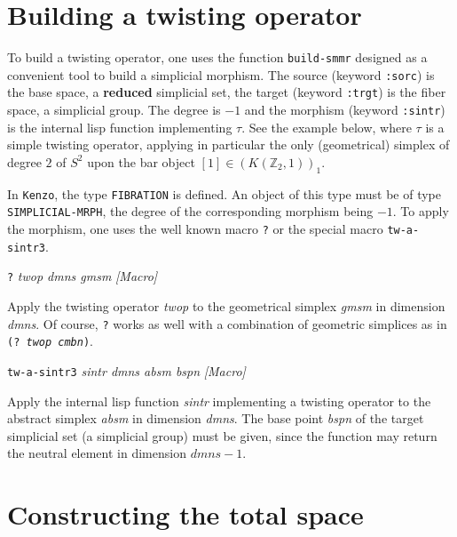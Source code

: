 \section {Building a twisting operator}

To build a twisting operator, one uses the function {\tt build-smmr} designed as a convenient tool
to build a simplicial morphism. The source (keyword {\tt :sorc}) is the base space, a {\bf reduced} simplicial
set, the target (keyword {\tt :trgt}) is the fiber space, a simplicial group. The degree is $-1$ and
the morphism (keyword {\tt :sintr}) is the internal lisp function implementing $\tau$. See the example
below, where $\tau$ is a simple twisting operator, applying in particular the only (geometrical) simplex
of degree $2$  of $S^2$ upon the bar object  $[1] \in (K(\mathbb{Z}_2,1))_1$. \par
In {\tt Kenzo}, the type {\tt FIBRATION} is defined. An object of this type must be of type
{\tt SIMPLICIAL-MRPH}, the degree of the corresponding morphism  being  $-1$. To apply the morphism,
one uses the well known macro {\tt ?} or the special macro {\tt tw-a-sintr3}.
\vskip 0.30cm
{\parindent=0mm
{\leftskip=5mm
{\tt ?} {\em twop dmns gmsm}  \hfill {\em [Macro]} \par}
{\leftskip=15mm
Apply the twisting operator {\em twop} to the geometrical simplex {\em gmsm} in dimension
{\em dmns}. Of course, {\tt ?} works as well with a combination of geometric simplices
as in  {\tt (? {\em twop cmbn})}. \par}
{\leftskip=5mm
{\tt tw-a-sintr3} {\em sintr dmns absm bspn} \hfill {\em [Macro]} \par}
{\leftskip=15mm
Apply the internal lisp function {\em sintr} implementing a twisting o\-pe\-ra\-tor to the
abstract simplex {\em absm} in dimension {\em dmns}. The base point {\em bspn} of the
target simplicial set (a simplicial group) must be given, since the function may return the neutral
element in dimension $dmns - 1$. \par}
}
\newpage

\section {Constructing the total space}

